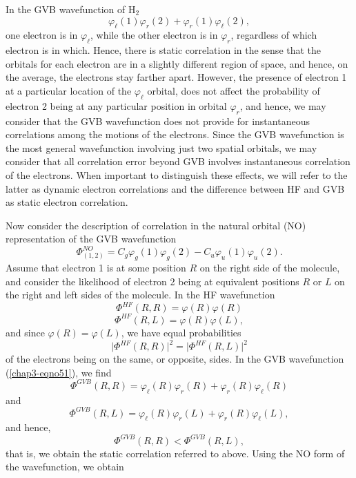 In the GVB wavefunction of H$_2$
\begin{equation}
\varphi_\ell ( 1 ) \varphi_r ( 2) + \varphi_r ( 1 ) \varphi_\ell ( 2 ) ,
\label{chap3-eqno51}
\end{equation}
one electron is in $\varphi_\ell$, while the other electron is in $\varphi_r$, 
regardless of which electron is in which.  Hence, there is static correlation 
in the sense that the orbitals for each electron are in a slightly 
different region of space, and hence, on the average, the electrons stay 
farther apart.  However, the presence of electron 1 at a
particular location of the $\varphi_\ell$ orbital, does not affect the probability 
of electron 2 being at any particular position in orbital $\varphi_r$, and 
hence, we may consider that the GVB wavefunction does 
not provide for instantaneous correlations among the motions of the 
electrons.  Since the GVB wavefunction is the most
general wavefunction involving just two spatial orbitals, we may consider 
that all correlation error beyond GVB involves 
instantaneous correlation of the electrons.  When important to distinguish 
these effects, we will refer to the latter as dynamic electron correlations 
and the difference between HF and GVB as 
static electron correlation.

Now consider the description of correlation in the natural orbital (NO)
representation of the GVB wavefunction
\begin{equation}
\Phi^{NO}_{(1,2)} = C_g \varphi_g(1) \varphi_g (2) - C_u 
\varphi_u(1)\varphi_u(2).
\label{chap3-eqno52}
\end{equation}
Assume that electron 1 is at some position $R$ on the right side of the 
molecule, and consider the likelihood of electron 2 being at equivalent 
positions $R$ or $L$ on the right and left sides of the molecule. In the 
HF wavefunction
\begin{equation}
\Phi^{HF} (R,R) = \varphi(R) \varphi(R)
\end{equation}
\begin{equation}
\Phi^{HF} (R , L) = \varphi (R) \varphi(L) ,
\end{equation}
and since $\varphi(R) = \varphi(L)$, we have equal probabilities
\begin{equation}
\vert \Phi^{HF} (R , R) \vert^2 = \vert \Phi^{HF} (R , L) \vert^2
\end{equation}
of the electrons being on the same, or opposite, sides.  In the GVB
wavefunction (\ref{chap3-eqno51}), we find 
\begin{equation}
\Phi^{GVB} (R , R) = \varphi_\ell ( R ) \varphi_r (R) + \varphi_r (R) \varphi_\ell(R)
\end{equation}
and
\begin{equation}
\Phi^{GVB} (R , L) = \varphi_\ell ( R ) \varphi_r (L) + \varphi_r (R) \varphi_\ell(L) ,
\end{equation}
and hence,
\begin{equation}
\Phi^{GVB} (R,R) < \Phi^{GVB} (R,L),
\label{chap3-eqno53}
\end{equation}
that is, we obtain the static correlation referred to above.  Using the 
NO form of the wavefunction, we obtain

